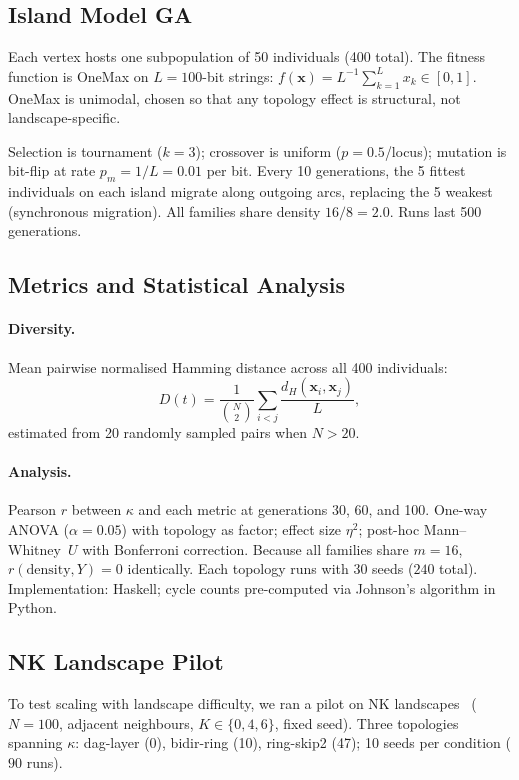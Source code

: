 \documentclass{llncs}
\begin{document}
\subsection{Island Model GA}

Each vertex hosts one subpopulation of 50 individuals (400 total). The fitness
function is OneMax on $L = 100$-bit strings:
$f(\mathbf{x}) = L^{-1}\sum_{k=1}^{L} x_k \in [0, 1]$. OneMax is unimodal,
chosen so that any topology effect is structural, not landscape-specific.

Selection is tournament ($k = 3$); crossover is uniform ($p = 0.5$/locus);
mutation is bit-flip at rate $p_m = 1/L = 0.01$ per bit. Every 10 generations,
the 5 fittest individuals on each island migrate along outgoing arcs, replacing
the 5 weakest (synchronous migration). All families share density
$16/8 = 2.0$. Runs last 500 generations.

\subsection{Metrics and Statistical Analysis}

\paragraph{Diversity.} Mean pairwise normalised Hamming distance across all 400
individuals:
\[
  D(t) = \frac{1}{\binom{N}{2}} \sum_{i < j}
    \frac{d_H(\mathbf{x}_i, \mathbf{x}_j)}{L},
\]
estimated from 20 randomly sampled pairs when $N > 20$.

\paragraph{Analysis.} Pearson $r$ between $\kappa$ and each metric at
generations 30, 60, and 100. One-way ANOVA ($\alpha = 0.05$) with topology as
factor; effect size $\eta^2$; post-hoc Mann--Whitney~$U$ with Bonferroni
correction. Because all families share $m = 16$, $r(\text{density}, Y) = 0$
identically. Each topology runs with 30 seeds ($240$ total). Implementation:
Haskell; cycle counts pre-computed via Johnson's algorithm in Python.

\subsection{NK Landscape Pilot}

To test scaling with landscape difficulty, we ran a pilot on NK
landscapes~\cite{kauffman1993origins} ($N = 100$, adjacent neighbours,
$K \in \{0, 4, 6\}$, fixed seed). Three topologies spanning $\kappa$:
dag-layer (0), bidir-ring (10), ring-skip2 (47); 10 seeds per condition
($90$ runs).
\end{document}

